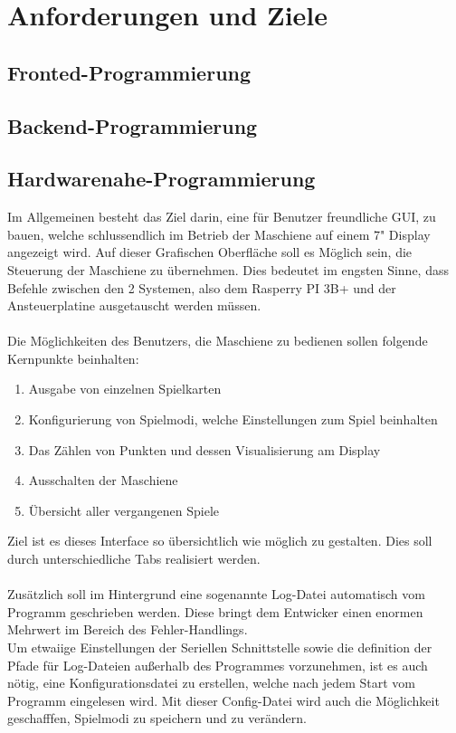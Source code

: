 \section{Anforderungen und Ziele}\label{subsec:anforderungen-und-ziele}

\subsection{Fronted-Programmierung}
\subsection{Backend-Programmierung}
\subsection{Hardwarenahe-Programmierung}

Im Allgemeinen besteht das Ziel darin, eine für Benutzer freundliche GUI, zu bauen, welche schlussendlich im Betrieb der Maschiene auf einem 7" Display angezeigt wird. Auf dieser Grafischen Oberfläche soll es Möglich sein, die Steuerung der Maschiene zu übernehmen.
Dies bedeutet im engsten Sinne, dass Befehle zwischen den 2 Systemen, also dem Rasperry PI 3B+ und der Ansteuerplatine ausgetauscht werden müssen.\\\\
Die Möglichkeiten des Benutzers, die Maschiene zu bedienen sollen folgende Kernpunkte beinhalten:
\begin{enumerate}
    \item Ausgabe von einzelnen Spielkarten
    \item Konfigurierung von Spielmodi, welche Einstellungen zum Spiel beinhalten
    \item Das Zählen von Punkten und dessen Visualisierung am Display
    \item Ausschalten der Maschiene
    \item Übersicht aller vergangenen Spiele
\end{enumerate}
Ziel ist es dieses Interface so übersichtlich wie möglich zu gestalten. Dies soll durch unterschiedliche Tabs realisiert werden.\\\\
Zusätzlich soll im Hintergrund eine sogenannte Log-Datei automatisch vom Programm geschrieben werden. Diese bringt dem Entwicker einen enormen Mehrwert im Bereich des Fehler-Handlings. \\
Um etwaiige Einstellungen der Seriellen Schnittstelle sowie die definition der Pfade für Log-Dateien außerhalb des Programmes vorzunehmen, ist es auch nötig, eine Konfigurationsdatei zu erstellen, welche nach jedem Start vom Programm eingelesen wird. Mit dieser Config-Datei wird auch die Möglichkeit geschafffen,
Spielmodi zu speichern und zu verändern.

